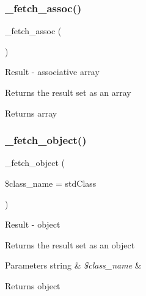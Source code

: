\subsubsection{\texorpdfstring{\+\_\+fetch\+\_\+assoc()}{\_fetch\_assoc()}}
{\footnotesize\ttfamily \+\_\+fetch\+\_\+assoc (\begin{DoxyParamCaption}{ }\end{DoxyParamCaption})\hspace{0.3cm}{\ttfamily [protected]}}

Result -\/ associative array

Returns the result set as an array

\begin{DoxyReturn}{Returns}
array 
\end{DoxyReturn}
\mbox{\label{class_c_i___d_b__sqlsrv__result_a60806be6a9c2488820813c2a7f4fef71}} 
\subsubsection{\texorpdfstring{\+\_\+fetch\+\_\+object()}{\_fetch\_object()}}
{\footnotesize\ttfamily \+\_\+fetch\+\_\+object (\begin{DoxyParamCaption}\item[{}]{\$class\+\_\+name = {\ttfamily \textquotesingle{}stdClass\textquotesingle{}} }\end{DoxyParamCaption})\hspace{0.3cm}{\ttfamily [protected]}}

Result -\/ object

Returns the result set as an object


\begin{DoxyParams}[1]{Parameters}
string & {\em \$class\+\_\+name} & \\
\hline
\end{DoxyParams}
\begin{DoxyReturn}{Returns}
object 
\end{DoxyReturn}
\mbox{\label{class_c_i___d_b__sqlsrv__result_a84bffd65e53902ade1591716749a33e3}} 
